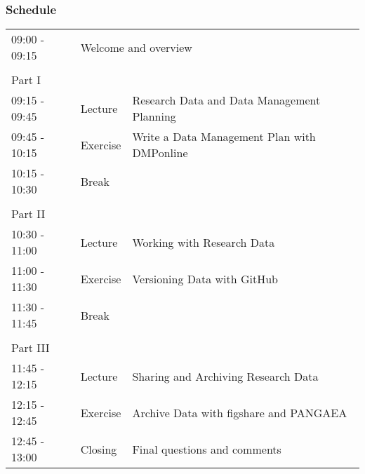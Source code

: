 \documentclass{beamer}
\begin{document}
\begin{frame}
  \frametitle{Schedule}
  \small
  \begin{center}
  \begin{tabular}{llp{7cm}}
  09:00 - 09:15 & \multicolumn{2}{l}{Welcome and overview} \\
  & & \\	
  Part I & \\	
  \hline
  09:15 - 09:45 & Lecture & Research Data and Data Management Planning \\
  09:45 - 10:15 & Exercise & Write a Data Management Plan with DMPonline \\ 
  10:15 - 10:30 & Break & \\
  & & \\
  Part II & \\
  \hline 
  10:30 - 11:00 & Lecture & Working with Research Data \\
  11:00 - 11:30 & Exercise & Versioning Data with GitHub \\
  11:30 - 11:45 & Break & \\
  & & \\
  Part III & \\
  \hline 
  11:45 - 12:15 & Lecture & Sharing and Archiving Research Data \\
  12:15 - 12:45 & Exercise & Archive Data with figshare and PANGAEA \\
  12:45 - 13:00 & Closing & Final questions and comments \\
  \end{tabular}
  \end{center}
\end{frame}
\end{document}
